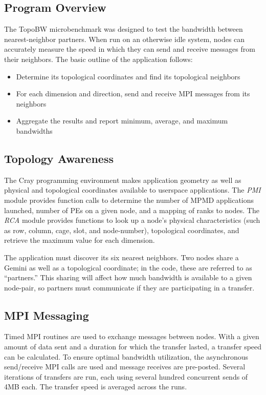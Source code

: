 \documentclass[10pt, conference, compsocconf]{IEEEtran}
\begin{document}
\subsection{Program Overview}

The TopoBW microbenchmark was designed to test the bandwidth between
nearest-neighbor partners.  When run on an otherwise idle system, nodes can
accurately measure the speed in which they can send and receive messages from
their neighbors.  The basic outline of the application follows:

\begin{itemize}
	\item Determine its topological coordinates and find its topological neighbors
	\item For each dimension and direction, send and receive MPI messages from its neighbors
	\item Aggregate the results and report minimum, average, and maximum bandwidths
\end{itemize}

\subsection{Topology Awareness}

The Cray programming environment makes application geometry as well as physical
and topological coordinates available to userspace applications.  The
\emph{PMI} module provides function calls to determine the number of MPMD
applications launched, number of PEs on a given node, and a mapping of ranks to
nodes.  The \emph{RCA} module provides functions to look up a node's physical
characteristics (such as row, column, cage, slot, and node-number), topological
coordinates, and retrieve the maximum value for each dimension.

The application must discover its six nearest neigbhors.  Two nodes share a
Gemini as well as a topological coordinate;  in the code, these are referred to
as ``partners.''  This sharing will affect how much bandwidth is available to a
given node-pair, so partners must communicate if they are participating in a
transfer.

\subsection{MPI Messaging}

Timed MPI routines are used to exchange messages between nodes.  With a given
amount of data sent and a duration for which the transfer lasted, a transfer
speed can be calculated.  To ensure optimal bandwidth utilization, the
asynchronous send/receive MPI calls are used and message receives are
pre-posted.  Several iterations of transfers are run, each using several
hundred concurrent sends of 4MB each.  The transfer speed is averaged across
the runs.
\end{document}
